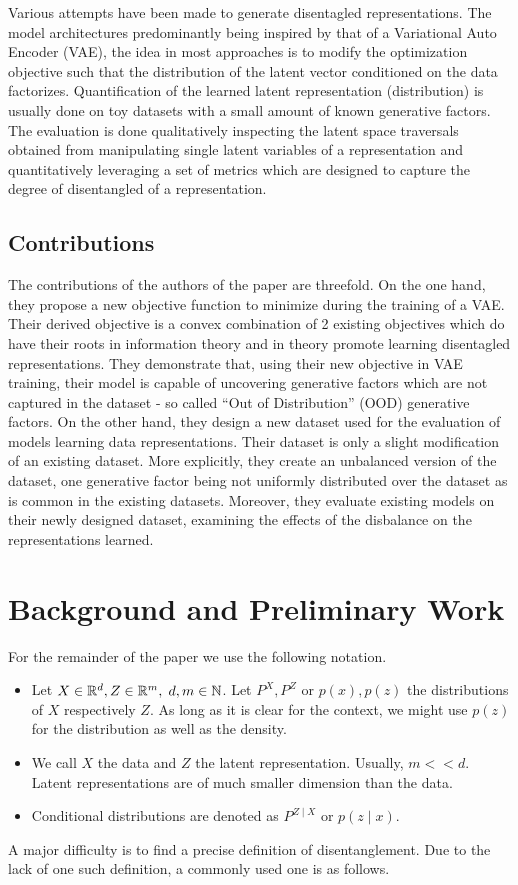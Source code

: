 \documentclass[twoside,11pt]{article}
\newcommand{\N}{\mathbb{N}}
\newcommand{\R}{\mathbb{R}}
\begin{document}
Various attempts have been made to generate disentagled representations. The model architectures predominantly being inspired by that of a Variational Auto Encoder (VAE), the idea in most approaches is to modify the optimization objective such that the distribution of the latent vector conditioned on the data factorizes.
Quantification of the learned latent representation (distribution) is usually done on toy datasets with a small amount of known generative factors. The evaluation is done qualitatively inspecting the latent space traversals obtained from manipulating single latent variables of a representation and quantitatively leveraging a set of metrics which are designed to capture the degree of disentangled of a representation.

\subsection{Contributions}
The contributions of the authors of the paper are threefold. On the one hand, they propose a new objective function to minimize during the training of a VAE. Their derived objective is a convex combination of 2 existing objectives which do have their roots in information theory and in theory promote learning disentagled representations.
They demonstrate that, using their new objective in VAE training, their model is capable of uncovering generative factors which are not captured in the dataset - so called \enquote{Out of Distribution} (OOD) generative factors.
On the other hand, they design a new dataset used for the evaluation of models learning data representations. Their dataset is only a slight modification of an existing dataset. More explicitly, they create an unbalanced version of the dataset, one generative factor being not uniformly distributed over the dataset as is common in the existing datasets.
Moreover, they evaluate existing models on their newly designed dataset, examining the effects of the disbalance on the representations learned.

\section{Background and Preliminary Work}
For the remainder of the paper we use the following notation.
\begin{itemize}
  \item Let $X \in \R^{d}, Z \in \R^{m}, \hspace{0.1 cm} d,m \in \N$. Let $P^{X}, P^{Z}$ or $p(x), p(z)$ the distributions of $X$ respectively $Z$. As long as it is clear for the context, we might use $p(z)$ for the distribution as well as the density.
  \item We call $X$ the data and $Z$ the latent representation. Usually, $m << d$. Latent representations are of much smaller dimension than the data.
  \item Conditional distributions are denoted as $P^{Z \mid X}$ or $p(z \mid x)$.
\end{itemize}
A major difficulty is to find a precise definition of disentanglement. Due to the lack of one such definition, a commonly used one is as follows.
\end{document}
